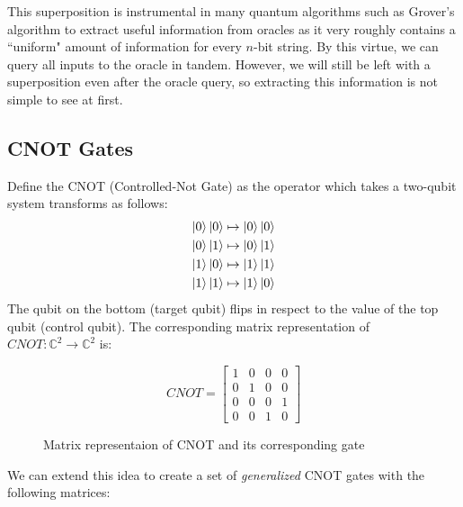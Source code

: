 \documentclass[quantum.tex]{subfiles}
\begin{document}
This superposition is instrumental in many quantum algorithms such as Grover's algorithm to extract useful information from oracles as it very roughly contains a ``uniform" amount of information for every $n$-bit string. By this virtue, we can query all inputs to the oracle in tandem. However, we will still be left with a superposition even after the oracle query, so extracting this information is not simple to see at first.

\subsection{CNOT Gates}
Define the CNOT (Controlled-Not Gate) as the operator which takes a two-qubit system transforms as follows:
\begin{gather*}
  \ket{0}\ket{0} \mapsto \ket{0}\ket{0} \\
  \ket{0}\ket{1} \mapsto \ket{0}\ket{1} \\
  \ket{1}\ket{0} \mapsto \ket{1}\ket{1} \\
  \ket{1}\ket{1} \mapsto \ket{1}\ket{0}
\end{gather*}
The qubit on the bottom (target qubit) flips in respect to the value of the top qubit (control qubit). The corresponding matrix representation of $CNOT: \mathbb{C}^2 \rightarrow \mathbb{C}^2$ is:

\begin{figure}[h]
  \centering
  \leavevmode
  \begin{equation}
    CNOT = \begin{bmatrix}1 & 0 & 0 & 0 \\ 0 & 1 & 0 & 0 \\ 0 & 0 & 0 & 1 \\ 0 & 0 & 1 & 0 \end{bmatrix}
  \end{equation}
    \caption{Matrix representaion of CNOT and its corresponding gate}
\end{figure}


We can extend this idea to create a set of \textit{generalized} CNOT gates with the following matrices:
\end{document}
